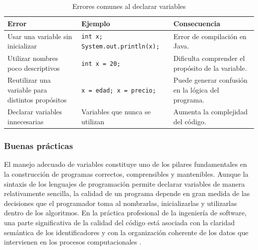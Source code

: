 \documentclass[12pt,twoside]{book}
\begin{document}
					\begin{table}[!hbt]
						\centering
						\caption{Errores comunes al declarar variables}
						\label{tab:erroresVariables}
						\small
						\begin{tabularx}{\textwidth}{X X X}
							\toprule
							\textbf{Error} & \textbf{Ejemplo} & \textbf{Consecuencia} \\
							\midrule
							Usar una variable sin inicializar & \texttt{int x; System.out.println(x);} & Error de compilación en Java. \\
							
							Utilizar nombres poco descriptivos & \texttt{int x = 20;} & Dificulta comprender el propósito de la variable. \\
							
							Reutilizar una variable para distintos propósitos & \texttt{x = edad; x = precio;} & Puede generar confusión en la lógica del programa. \\
							
							Declarar variables innecesarias & Variables que nunca se utilizan & Aumenta la complejidad del código. \\
							
							\bottomrule
						\end{tabularx}
					\end{table}
					
					\subsubsection{Buenas prácticas}
						\noindent
						El manejo adecuado de variables constituye uno de los pilares fundamentales en la construcción de programas correctos, comprensibles y mantenibles. Aunque la sintaxis de los lenguajes de programación permite declarar variables de manera relativamente sencilla, la calidad de un programa depende en gran medida de las decisiones que el programador toma al nombrarlas, inicializarlas y utilizarlas dentro de los algoritmos. En la práctica profesional de la ingeniería de software, una parte significativa de la calidad del código está asociada con la claridad semántica de los identificadores y con la organización coherente de los datos que intervienen en los procesos computacionales \cite{Pressman2019Software,Sommerville2015Software}.
						
\end{document}
